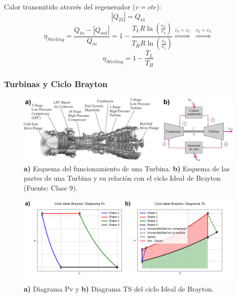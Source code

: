             Calor transmitido através del regenerador (\(v=cte\)):
            \[|Q_{23}|=Q_{41}\]
            \[\eta_{Stirling}=\frac{Q_{in}-|Q_{out}|}{Q_{in}}=1-\frac{T_{L}R\ln(\frac{v_{3}}{v_{4}})}{T_{H}R\ln(\frac{v_{2}}{v_{1}})}\overset{v_{4}=v_{1}}{\Rightarrow}\;\overset{v_{2}=v_{3}}{\Rightarrow}\]
            \begin{equation}
            \label{eficiencia_stirling}
                \eta_{Stirling}=1-\frac{T_{L}}{T_{H}}
            \end{equation}
        
        \subsubsection{Turbinas y Ciclo Brayton}
        
            
            \begin{figure}[H]
              \includegraphics[width=\textwidth]{img/clases/turbinas.png}
                \caption[Esquema de Turbinas]{\textbf{a)} Esquema del funcionamiento de una Turbina. \textbf{b)} Esquema de las partes de una Turbina y su relación con el ciclo Ideal de Brayton (Fuente: Clase 9).}
                \label{fig:turbinas}
            \end{figure}
            
            \begin{figure}
                \includegraphics[width=\textwidth]{img/ciclos/ciclo_brayton.png}
                \caption[Ciclo Ideal de Brayton]{\textbf{a)} Diagrama Pv y \textbf{b)} Diagrama TS del ciclo Ideal de Brayton.}
                \label{fig:ciclo_brayton}
            \end{figure}
            

